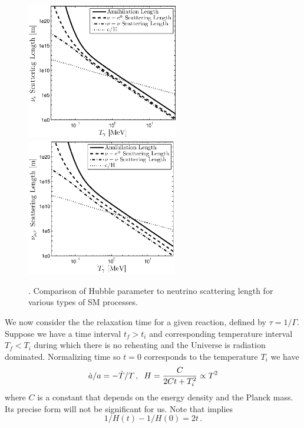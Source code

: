 \begin{figure}[ht]
\centerline{\includegraphics[height=6cm]{04-birrell/ParametricStudies/Figures/nu_e_scattering_length_eta_0_23.eps}\includegraphics[height=6cm]{04-birrell/ParametricStudies/Figures/nu_mu_scattering_length_eta_0_23.eps}}
\caption{. Comparison of Hubble parameter to neutrino scattering length for various types of SM processes.  }\label{fig:scatt_length}
\end{figure}


We now consider the the relaxation time for a given reaction, defined by $\tau=1/\Gamma$.  Suppose we have a time interval $t_f>t_i$  and corresponding temperature interval $T_f<T_i$ during which there is no reheating and the Universe is radiation dominated.  Normalizing time so $t=0$ corresponds to the temperature $T_i$ we have
\begin{equation}\label{ch6:H_eq}
\dot a/a=-\dot T/T\,,\hspace{2mm} H=\frac{C}{2Ct+T_i^2}\propto T^2
\end{equation}
where $C$ is a constant that depends on the energy density and the Planck mass.  Its precise form will not be significant for us.  Note that  implies
\begin{equation}
1/H(t)-1/H(0)=2t\,.
\end{equation}

